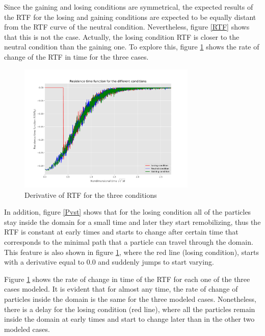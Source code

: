 \documentclass[draft,linenumbers]{agujournal2018}
\begin{document}
Since the gaining and losing conditions are symmetrical, the expected results of the RTF for the losing and gaining conditions are expected to be equally distant from the RTF curve of the neutral condition. Nevertheless, figure \ref{RTF} shows that this is not the case. Actually, the losing condition RTF is closer to the neutral condition than the gaining one. To explore this, figure \ref{RTFder} shows the rate of change of the RTF in time for the three cases.

\begin{figure}[ht]
\centering
\includegraphics[trim=0.2cm 0.2cm 0.2cm 0.2cm, width=20pc]
{181203_RTF_der.pdf}
\caption{Derivative of RTF for the three conditions}
\label{RTFder}
\end{figure}

In addition, figure \ref{Pvst} shows that for the losing condition all of the particles stay inside the domain for a small time and later they start remobilizing, thus the RTF is constant at early times and starts to change after certain time that corresponds to the minimal path that a particle can travel through the domain. This feature is also shown in figure \ref{RTFder}, where the red line (losing condition), starts with a derivative equal to 0.0 and suddenly jumps to start varying. 

Figure \ref{RTFder} shows the rate of change in time of the RTF for each one of the three cases modeled. It is evident that for almost any time, the rate of change of particles inside the domain is the same for the three modeled cases. Nonetheless, there is a delay for the losing condition (red line), where all the particles remain inside the domain at early times and start to change later than in the other two modeled cases.
\end{document}
